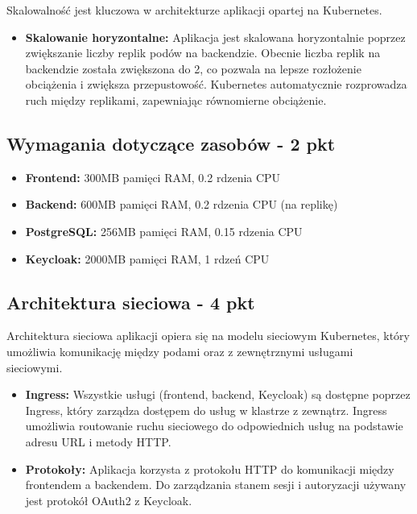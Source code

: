 \documentclass[12pt,a4paper]{article}
\begin{document}
Skalowalność jest kluczowa w architekturze aplikacji opartej na Kubernetes.

\begin{itemize}
\item \textbf{Skalowanie horyzontalne:} Aplikacja jest skalowana horyzontalnie poprzez zwiększanie liczby replik podów na backendzie. Obecnie liczba replik na backendzie została zwiększona do 2, co pozwala na lepsze rozłożenie obciążenia i zwiększa przepustowość. Kubernetes automatycznie rozprowadza ruch między replikami, zapewniając równomierne obciążenie.

\end{itemize}

\subsection{Wymagania dotyczące zasobów - 2 pkt}
\label{sec:ExampleTables}

\begin{itemize}
\item \textbf{Frontend:} 300MB pamięci RAM, 0.2 rdzenia CPU
\item \textbf{Backend:} 600MB pamięci RAM, 0.2 rdzenia CPU (na replikę)
\item \textbf{PostgreSQL:} 256MB pamięci RAM, 0.15 rdzenia CPU
\item \textbf{Keycloak:} 2000MB pamięci RAM, 1 rdzeń CPU
\end{itemize}


\subsection{Architektura sieciowa - 4 pkt}
\label{sec:ExampleResults}

Architektura sieciowa aplikacji opiera się na modelu sieciowym Kubernetes, który umożliwia komunikację między podami oraz z zewnętrznymi usługami sieciowymi.

\begin{itemize}
\item \textbf{Ingress:} Wszystkie usługi (frontend, backend, Keycloak) są dostępne poprzez Ingress, który zarządza dostępem do usług w klastrze z zewnątrz. Ingress umożliwia routowanie ruchu sieciowego do odpowiednich usług na podstawie adresu URL i metody HTTP.

\item \textbf{Protokoły:} Aplikacja korzysta z protokołu HTTP do komunikacji między frontendem a backendem. Do zarządzania stanem sesji i autoryzacji używany jest protokół OAuth2 z Keycloak.

\end{itemize}

\nocite{*}
\end{document}
